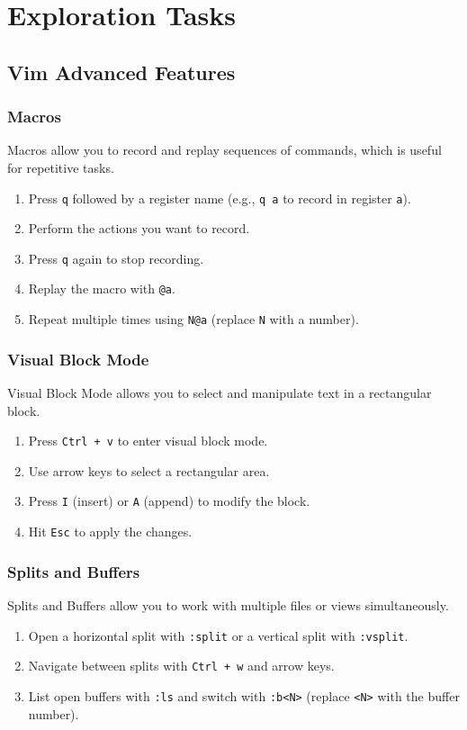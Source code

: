 \documentclass{article}
\begin{document}
\section{Exploration Tasks}
\subsection{Vim Advanced Features}
\subsubsection{Macros}
Macros allow you to record and replay sequences of commands, which is useful for repetitive tasks.
\begin{enumerate}
    \item Press \texttt{q} followed by a register name (e.g., \texttt{q a} to record in register \texttt{a}).
    \item Perform the actions you want to record.
    \item Press \texttt{q} again to stop recording.
    \item Replay the macro with \texttt{@a}.
    \item Repeat multiple times using \texttt{N@a} (replace \texttt{N} with a number).
\end{enumerate}

\subsubsection{Visual Block Mode}
Visual Block Mode allows you to select and manipulate text in a rectangular block.
\begin{enumerate}
    \item Press \texttt{Ctrl + v} to enter visual block mode.
    \item Use arrow keys to select a rectangular area.
    \item Press \texttt{I} (insert) or \texttt{A} (append) to modify the block.
    \item Hit \texttt{Esc} to apply the changes.
\end{enumerate}

\subsubsection{Splits and Buffers}
Splits and Buffers allow you to work with multiple files or views simultaneously.
\begin{enumerate}
    \item Open a horizontal split with \texttt{:split} or a vertical split with \texttt{:vsplit}.
    \item Navigate between splits with \texttt{Ctrl + w} and arrow keys.
    \item List open buffers with \texttt{:ls} and switch with \texttt{:b<N>} (replace \texttt{<N>} with the buffer number).
\end{enumerate}
\end{document}
